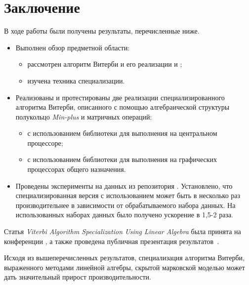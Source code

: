 \section{Заключение}
В ходе работы были получены результаты, перечисленные ниже.
\begin{itemize}
	\item Выполнен обзор предметной области:
		\begin{itemize}
			\item рассмотрен алгоритм Витерби и его реализации  и ;
			\item изучена техника специализации.
		\end{itemize}
	\item Реализованы и протестированы две реализации специализированного алгоритма Витерби, описанного с помощью алгебраической структуры полукольцо \emph{Min-plus} и матричных операций:
		\begin{itemize}
			\item с использованием библиотеки  для выполнения на центральном процессоре;
			\item с использованием библиотеки  для выполнения на графических процессорах общего назначения.
		\end{itemize}
	\item Проведены эксперименты на данных из репозитория . 
Установлено, что специализированная версия с использованием 
 может быть
в несколько раз производительнее  в зависимости от обрабатываемого набора данных.
На использованных наборах данных было получено ускорение в 1,5-2 раза.
\end{itemize}

Статья \emph{Viterbi Algorithm Specialization Using Linear 
Algebra} была принята на конференции , а 
также проведена публичная презентация результатов~\cite{paper}.

Исходя из вышеперечисленных результатов, специализация 
алгоритма Витерби, выраженного методами линейной алгебры, 
скрытой марковской моделью может дать значительный прирост 
производительности.
